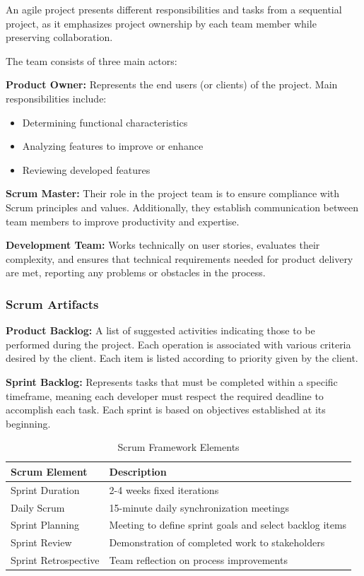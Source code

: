 An agile project presents different responsibilities and tasks from a sequential project, as it emphasizes project ownership by each team member while preserving collaboration.

The team consists of three main actors:

\textbf{Product Owner:} Represents the end users (or clients) of the project. Main responsibilities include:
\begin{itemize}
    \item Determining functional characteristics
    \item Analyzing features to improve or enhance
    \item Reviewing developed features
\end{itemize}

\textbf{Scrum Master:} Their role in the project team is to ensure compliance with Scrum principles and values. Additionally, they establish communication between team members to improve productivity and expertise.

\textbf{Development Team:} Works technically on user stories, evaluates their complexity, and ensures that technical requirements needed for product delivery are met, reporting any problems or obstacles in the process.

\subsubsection{Scrum Artifacts}

\textbf{Product Backlog:} A list of suggested activities indicating those to be performed during the project. Each operation is associated with various criteria desired by the client. Each item is listed according to priority given by the client.

\textbf{Sprint Backlog:} Represents tasks that must be completed within a specific timeframe, meaning each developer must respect the required deadline to accomplish each task. Each sprint is based on objectives established at its beginning.

\begin{table}[H]
\centering
\begin{tabular}{|l|p{10cm}|}
\hline
\textbf{Scrum Element} & \textbf{Description} \\
\hline
Sprint Duration & 2-4 weeks fixed iterations \\
\hline
Daily Scrum & 15-minute daily synchronization meetings \\
\hline
Sprint Planning & Meeting to define sprint goals and select backlog items \\
\hline
Sprint Review & Demonstration of completed work to stakeholders \\
\hline
Sprint Retrospective & Team reflection on process improvements \\
\hline
\end{tabular}
\caption{Scrum Framework Elements}
\label{tab:scrum_elements}
\end{table}

